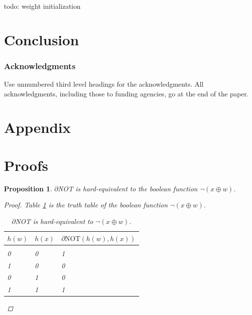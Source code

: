 \documentclass{article} %
\newtheorem{prop}{Proposition}
\begin{document}
todo: weight initialization

\section{Conclusion}



\subsubsection*{Acknowledgments}
Use unnumbered third level headings for the acknowledgments. All
acknowledgments, including those to funding agencies, go at the end of the paper.





\appendix

\section*{Appendix}

\section{Proofs}

\begin{prop}\label{prop:not}
	$\partial${NOT} is hard-equivalent to the boolean function
	$\neg (x \oplus w)$.
\begin{proof}
	Table \ref{not-table} is the truth table of the boolean function $\neg (x \oplus w)$.
	\begin{table}
		\begin{center}
			\begin{tabular}{lll}
				\multicolumn{1}{c}{$h(w)$}  &\multicolumn{1}{c}{$h(x)$} &\multicolumn{1}{c}{$\partial\text{NOT}(h(w), h(x))$}
				\\ \hline \\
				0 & 0 & 1\\
				1 & 0 & 0\\
				0 & 1 & 0\\
				1 & 1 & 1\\
			\end{tabular}
		\end{center}
		\caption{$\partial${NOT} is hard-equivalent to $\neg (x \oplus w)$.}\label{not-table}
		
	\end{table}
\end{proof}
\end{prop}
\end{document}
